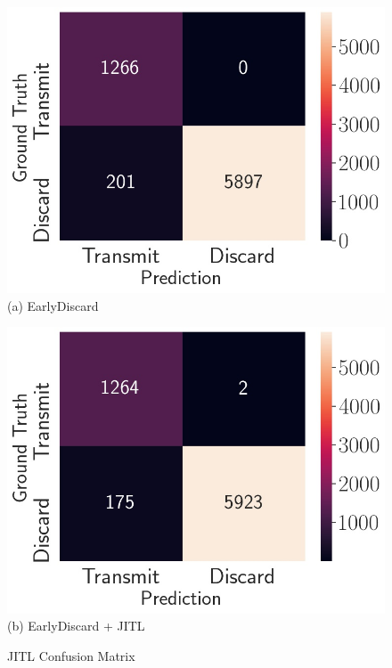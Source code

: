 \begin{figure}
    \centering
    \begin{minipage}[b]{.45\linewidth}
        \centering
        \includegraphics[width=\linewidth]{FIGS/jitl-earlydiscard-cm}\\
        {(a) EarlyDiscard}
    \end{minipage}
    \begin{minipage}[b]{.45\linewidth}
        \centering
        \includegraphics[width=\linewidth]{FIGS/jitl-combined-cm}\\
        {(b) EarlyDiscard + JITL}
    \end{minipage}
    \caption{JITL Confusion Matrix}
    \label{fig:wca-jitl}
\end{figure}

